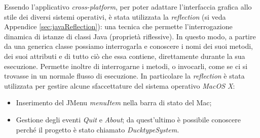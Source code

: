 Essendo l'applicativo \emph{cross-platform}, per poter adattare l'interfaccia grafica
allo stile dei diversi sistemi operativi, è stata utilizzata la \emph{reflection} (si veda Appendice \ref{sec:javaReflection}):
una tecnica che permette l’interrogazione dinamica di istanze di classi Java
(proprietà riflessive). In questo modo, a partire da una generica classe possiamo
interrogarla e conoscere i nomi dei suoi metodi, dei suoi attributi e di tutto ciò
che essa contiene, direttamente durante la sua esecuzione. Permette inoltre
 di interrogarne i metodi, o invocarli, come se ci si trovasse in un normale flusso di esecuzione.
In particolare la \emph{reflection} è stata utilizzata per gestire alcune sfaccettature del sistema operativo
\emph{MacOS X}: 
\begin{itemize}
	\item Inserimento del JMenu \emph{menuItem} nella barra di stato del Mac;
	\item Gestione degli eventi \emph{Quit} e \emph{About}; da quest'ultimo è possibile conoscere
	perché il progetto è stato chiamato \emph{DucktypeSystem.}
\end{itemize}
